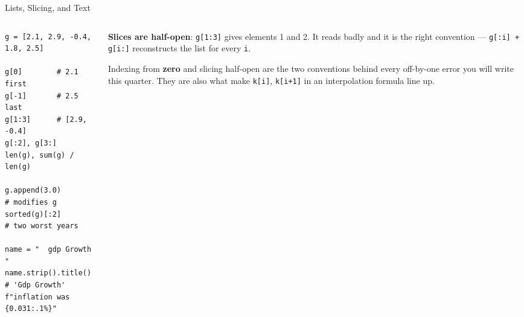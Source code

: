 \begin{frame}[fragile]{Lists, Slicing, and Text}
\begin{columns}[T]
\begin{column}{0.52\textwidth}
\begin{lstlisting}
g = [2.1, 2.9, -0.4, 1.8, 2.5]

g[0]        # 2.1   first
g[-1]       # 2.5   last
g[1:3]      # [2.9, -0.4]
g[:2], g[3:]
len(g), sum(g) / len(g)

g.append(3.0)       # modifies g
sorted(g)[:2]       # two worst years

name = "  gdp Growth "
name.strip().title()   # 'Gdp Growth'
f"inflation was {0.031:.1%}"
\end{lstlisting}
\end{column}
\begin{column}{0.45\textwidth}
\small
\textbf{Slices are half-open}: \texttt{g[1:3]} gives elements 1 and 2. It reads badly and it is the right convention --- \texttt{g[:i] + g[i:]} reconstructs the list for every \texttt{i}.
\medskip
\begin{conceptbox}\footnotesize
Indexing from \textbf{zero} and slicing half-open are the two conventions behind every off-by-one error you will write this quarter. They are also what make \texttt{k[i]}, \texttt{k[i+1]} in an interpolation formula line up.
\end{conceptbox}
\end{column}
\end{columns}
\vspace{1mm}
\end{frame}

